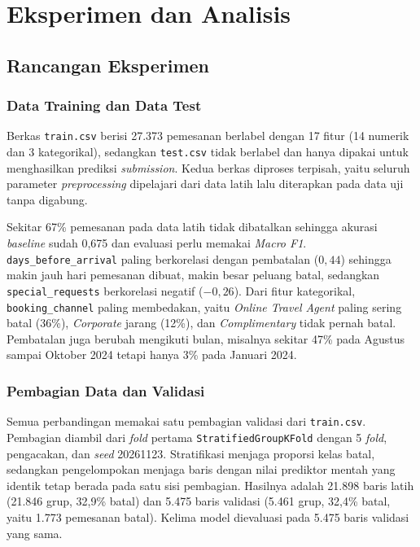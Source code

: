 \section{Eksperimen dan Analisis}

\subsection{Rancangan Eksperimen}

\subsubsection{Data Training dan Data Test}

Berkas \texttt{train.csv} berisi 27.373 pemesanan berlabel dengan 17 fitur (14
numerik dan 3 kategorikal), sedangkan \texttt{test.csv} tidak berlabel dan hanya
dipakai untuk menghasilkan prediksi \textit{submission}. Kedua berkas diproses
terpisah, yaitu seluruh parameter \textit{preprocessing} dipelajari dari data
latih lalu diterapkan pada data uji tanpa digabung.

Sekitar 67\% pemesanan pada data latih tidak dibatalkan sehingga akurasi
\textit{baseline} sudah 0,675 dan evaluasi perlu memakai \textit{Macro F1}.
\texttt{days\_before\_arrival} paling berkorelasi dengan pembatalan ($0{,}44$)
sehingga makin jauh hari pemesanan dibuat, makin besar peluang batal, sedangkan
\texttt{special\_requests} berkorelasi negatif ($-0{,}26$). Dari fitur
kategorikal, \texttt{booking\_channel} paling membedakan, yaitu \textit{Online Travel Agent} paling sering batal (36\%), \textit{Corporate} jarang (12\%), dan
\textit{Complimentary} tidak pernah batal. Pembatalan juga berubah mengikuti
bulan, misalnya sekitar 47\% pada Agustus sampai Oktober 2024 tetapi hanya 3\%
pada Januari 2024.

\subsubsection{Pembagian Data dan Validasi}

Semua perbandingan memakai satu pembagian validasi dari \texttt{train.csv}.
Pembagian diambil dari \textit{fold} pertama \texttt{StratifiedGroupKFold}
dengan 5 \textit{fold}, pengacakan, dan \textit{seed} 20261123. Stratifikasi
menjaga proporsi kelas batal, sedangkan pengelompokan menjaga baris dengan
nilai prediktor mentah yang identik tetap berada pada satu sisi pembagian.
Hasilnya adalah 21.898 baris latih (21.846 grup, 32,9\% batal) dan 5.475
baris validasi (5.461 grup, 32,4\% batal, yaitu 1.773 pemesanan batal). Kelima
model dievaluasi pada 5.475 baris validasi yang sama.

